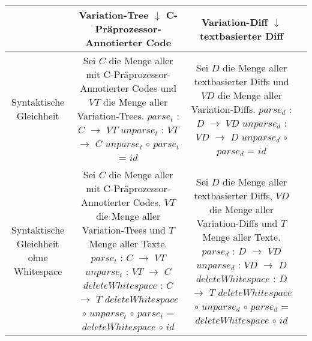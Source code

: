 \begin{table}[H]
	
	\begin{center}
		\begin{tabular}{ c||c|c|c| } 
			& \parbox[][2.5cm][]{4cm}{Variation-Tree\\ \hspace*{1cm} $\downarrow$ \\ C-Präprozessor-Annotierter Code} & \parbox[][][]{4cm}{Variation-Diff\\ \hspace*{1cm} $\downarrow$ \\ textbasierter Diff} \\ 
			\hline
			Syntaktische Gleichheit & \parbox[][3.5cm][]{5cm}{Sei $C$ die Menge aller mit C-Präprozessor-Annotierter Codes und $VT$ die Menge aller Variation-Trees.\\
				$parse_t$ : $C$ $\rightarrow$ $VT$\\
				$unparse_t$ : $VT$ $\rightarrow$ $C$\\
				$unparse_t$ $\circ$ $parse_t$ = $id$} & \parbox[][3.5cm][]{5cm}{Sei $D$ die Menge aller textbasierter  Diffs und $VD$ die Menge aller Variation-Diffs.\\
				$parse_d$ : $D$ $\rightarrow$ $VD$\\
				$unparse_d$ : $VD$ $\rightarrow$ $D$\\
				$unparse_d$ $\circ$ $parse_d$ = $id$} \\ 
			\hline
			\parbox[][1cm][]{4cm}{Syntaktische Gleichheit ohne Whitespace} & \parbox[][5.5cm][]{5.3cm}{Sei $C$ die Menge aller mit C-Präprozessor-Annotierter Codes, $VT$ die Menge aller Variation-Trees und $T$ Menge aller Texte.\\
				$parse_t$ : $C$ $\rightarrow$ $VT$\\
				$unparse_t$ : $VT$ $\rightarrow$ $C$\\
				$deleteWhitespace$ : $C$ $\rightarrow$ $T$\\
				$deleteWhitespace$ $\circ$ $unparse_t$ $\circ$ $parse_t$ = $deleteWhitespace$ $\circ$ $id$} & \parbox[][5.5cm][]{5.3cm}{Sei $D$ die Menge aller textbasierter Diffs, $VD$ die Menge aller Variation-Diffs und $T$ Menge aller Texte.\\
				$parse_d$ : $D$ $\rightarrow$ $VD$\\
				$unparse_d$ : $VD$ $\rightarrow$ $D$\\
				$deleteWhitespace$ : $D$ $\rightarrow$ $T$ \\ 
				$deleteWhitespace$ $\circ$ $unparse_d$ $\circ$ $parse_d$ = $deleteWhitespace$ $\circ$ $id$ } \\

\end{tabular}
\end{center}
\end{table}
